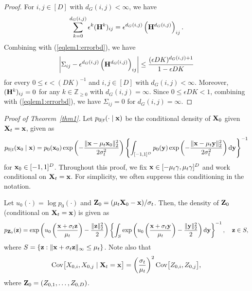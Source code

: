 \documentclass[11pt,a4paper,final]{article}
\numberwithin{equation}{section}
\theoremstyle{remark}
\newcommand{\bH}{{\bf H}}
\newcommand{\bx}{{\bf x}}
\newcommand{\bX}{{\bf X}}
\newcommand{\by}{{\bf y}}
\newcommand{\bz}{{\bf z}}
\newcommand{\bZ}{{\bf Z}}
\newcommand{\bbZ}{{\mathbb Z}}
\newcommand{\bean}{\setlength\arraycolsep{1pt}\begin{eqnarray*}}
\newcommand{\eean}{\end{eqnarray*}}
\def\d{{\rm d}}
\begin{document}
\begin{proof}
For $i,j \in [D]$ with $d_{G}(i,j) < \infty$, we have
\bean
\sum_{k=0}^{d_{G}(i,j)} \epsilon^{k} (\bH^{k})_{ij} = \epsilon^{d_{G}(i,j)} \left( \bH^{d_{G}(i,j)} \right)_{ij}.
\eean
Combining with (\ref{eqlem1:errorbd}), we have
\bean
\left\vert \Sigma_{ij} -  \epsilon^{d_{G}(i,j)} \left( \bH^{d_{G}(i,j)} \right)_{ij}  \right\vert
\leq
 \frac{(\epsilon D K)^{d_{G}(i,j)+1}}{1-\epsilon D K}
\eean
for every $0 \leq \epsilon < (DK)^{-1}$ and $i,j \in [D]$ with $d_{G}(i,j) < \infty$.
Moreover, $(\bH^{k})_{ij} = 0$ for any $k \in \bbZ_{\geq 0}$ with $d_{G}(i,j) = \infty$.
Since $0 \leq \epsilon D K < 1$, combining with (\ref{eqlem1:errorbd}), we have $\Sigma_{ij} = 0$ for $d_{G}(i,j) = \infty$.

\end{proof}

\medskip

\textit{Proof of Theorem~\ref{thm1}.}
Let $p_{0 \mid t}(\cdot \mid \bx)$ be the conditional density of $\bX_{0}$ given $ \bX_{t} = \bx$, given as 
\bean
p_{0 \mid t}(\bx_0 \mid \bx) = p_{0}(\bx_0) \exp \left( -\frac{ \|\bx - \mu_t \bx_0 \|_2^2 }{2\sigma_{t}^2} \right)  \left\{ \int_{[-1,1]^{D}} p_{0}(\by) \exp \left( -\frac{ \|\bx - \mu_t \by \|_2^2 }{2\sigma_{t}^2} \right) \d \by \right\}^{-1}
\eean
for $\bx_0 \in [-1,1]^{D}$.
Throughout this proof, we fix $\bx \in [-\mu_t \gamma, \mu_t \gamma]^{D}$ and work conditional on $\bX_t = \bx$. For simplicity, we often suppress this conditioning in the notation.

Let $u_0(\cdot) = \log p_0(\cdot)$ and $\bZ_0 = (\mu_t \bX_0 - \bx)/\sigma_t$.
Then, the density of $\bZ_0$ (conditional on $\bX_t = \bx$) is given as
\bean
p_{\bZ_0}(\bz) = \exp \left( u_0 \left( \frac{\bx + \sigma_t \bz}{\mu_t} \right) -  \frac{\| \bz \|_2^2}{2}  \right) 
\left\{ \int_{S} \exp \left( u_0 \left( \frac{\bx + \sigma_t \by}{\mu_t} \right) -  \frac{\| \by \|_2^2}{2}  \right) \d \by  \right\}^{-1},
\quad \bz \in S,
\eean
where $ S = \{ \bz : \|\bx + \sigma_t \bz \|_{\infty} \leq \mu_t \}$. 
Note also that
\bean
{\rm{Cov}} \big[ X_{0,i}, X_{0,j} \mid \bX_{t} = \bx \big] =  \left( \frac{\sigma_t}{\mu_t} \right)^2 \text{Cov} \big[ Z_{0,i}, Z_{0,j} \big],
\eean
where $\bZ_{0} = ( Z_{0,1}, \ldots, Z_{0,D} )$.
\end{document}
